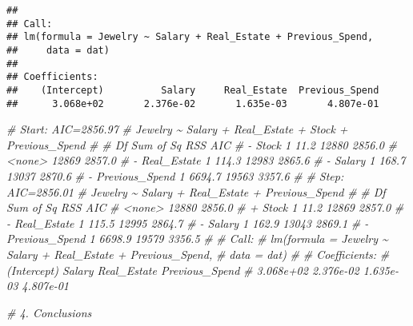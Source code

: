 \documentclass[
]{article}
\newenvironment{Shaded}{\begin{snugshade}}{\end{snugshade}}
\newcommand{\CommentTok}[1]{\textcolor[rgb]{0.56,0.35,0.01}{\textit{#1}}}
\begin{document}
\begin{verbatim}
## 
## Call:
## lm(formula = Jewelry ~ Salary + Real_Estate + Previous_Spend, 
##     data = dat)
## 
## Coefficients:
##    (Intercept)          Salary     Real_Estate  Previous_Spend  
##      3.068e+02       2.376e-02       1.635e-03       4.807e-01
\end{verbatim}

\begin{Shaded}
\begin{Highlighting}[]
    \CommentTok{\# Start:  AIC=2856.97}
    \CommentTok{\# Jewelry \textasciitilde{} Salary + Real\_Estate + Stock + Previous\_Spend}
    \CommentTok{\# }
    \CommentTok{\# Df Sum of Sq   RSS    AIC}
    \CommentTok{\# {-} Stock           1      11.2 12880 2856.0}
    \CommentTok{\# \textless{}none\textgreater{}                        12869 2857.0}
    \CommentTok{\# {-} Real\_Estate     1     114.3 12983 2865.6}
    \CommentTok{\# {-} Salary          1     168.7 13037 2870.6}
    \CommentTok{\# {-} Previous\_Spend  1    6694.7 19563 3357.6}
    \CommentTok{\# }
    \CommentTok{\# Step:  AIC=2856.01}
    \CommentTok{\# Jewelry \textasciitilde{} Salary + Real\_Estate + Previous\_Spend}
    \CommentTok{\# }
    \CommentTok{\#                   Df Sum of Sq   RSS    AIC}
    \CommentTok{\# \textless{}none\textgreater{}                        12880 2856.0}
    \CommentTok{\# + Stock           1      11.2 12869 2857.0}
    \CommentTok{\# {-} Real\_Estate     1     115.5 12995 2864.7}
    \CommentTok{\# {-} Salary          1     162.9 13043 2869.1}
    \CommentTok{\# {-} Previous\_Spend  1    6698.9 19579 3356.5}
    \CommentTok{\# }
    \CommentTok{\# Call:}
    \CommentTok{\#   lm(formula = Jewelry \textasciitilde{} Salary + Real\_Estate + Previous\_Spend, }
    \CommentTok{\#      data = dat)}
    \CommentTok{\# }
    \CommentTok{\# Coefficients:}
    \CommentTok{\#   (Intercept)       Salary     Real\_Estate  Previous\_Spend  }
    \CommentTok{\# 3.068e+02       2.376e{-}02       1.635e{-}03       4.807e{-}01  }

\CommentTok{\# 4. Conclusions}
\end{Highlighting}
\end{Shaded}
\end{document}
